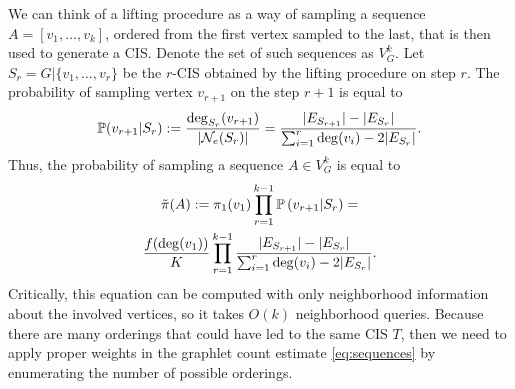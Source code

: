     
    We can think of a lifting procedure as a way of sampling a sequence $A = [v_1, \ldots, v_k]$, ordered from the first vertex sampled to the last, that is then used to generate a CIS.
	Denote the set of such sequences as $V^k_G$.
	Let $S_r = G|\{v_1,\ldots, v_r\}$ be the $r$-CIS obtained by the lifting procedure on step $r$.
	The probability of sampling vertex $v_{r+1}$ on the step $r+1$ is equal to
	\begin{equation*}
	    \mathbb{P}(v_{r+1}|S_{r}) := \frac{\mathrm{deg}_{S_r}(v_{r+1})}{|\mathcal{N}_e(S_r)|} =
	    \frac{|E_{S_{r+1}}| - |E_{S_r}|}{\sum_{i=1}^r \mathrm{deg}(v_i) - 2|E_{S_r}|}.
	\end{equation*}
	Thus, the probability of sampling a sequence $A \in V^k_G$ is equal to
	\begin{multline}
	\label{eq:tildepi}
	    \Tilde\pi(A) := \pi_1(v_1)\prod_{r=1}^{k-1} \P\left(v_{r+1}|S_r\right) =\\
	    \frac{f(\deg(v_1))}{K} \prod_{r=1}^{k-1} \frac{|E_{S_{r+1}}| - |E_{S_r}|}{\sum_{i=1}^r \deg(v_i) - 2|E_{S_r}|}.
	\end{multline}
    Critically, this equation can be computed with only neighborhood information about the involved vertices, so it takes $O(k)$ neighborhood queries.
    Because there are many orderings that could have led to the same CIS $T$, then we need to apply proper weights in the graphlet count estimate \eqref{eq:sequences} by enumerating the number of possible orderings.
    

